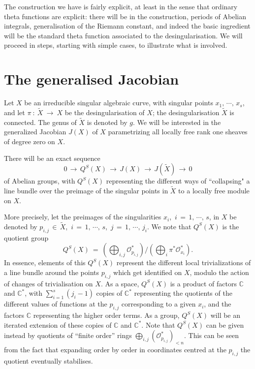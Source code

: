 \documentclass[12pt,reqno]{amsart}
\numberwithin{equation}{section}
\theoremstyle{definition}
\theoremstyle{remark}
\def\bC{{\mathbb {C}}}
\def\pO{{\mathcal O}}
\begin{document}
The construction we have is fairly explicit, at least in the sense that ordinary theta functions are 
explicit: there will be in the construction, periods of Abelian integrals, generalisation of the Riemann 
constant, and indeed the basic ingredient will be the standard theta function associated to the 
desingularisation. We will proceed in steps, starting with simple cases, to illustrate what is involved.

\section{The generalised Jacobian}

Let $X$ be an irreducible singular algebraic curve, with singular points $x_1,\,\cdots,\,x_s$, and let
$\pi\ :\ \widetilde X\ \longrightarrow\ X$ be the desingularisation of $X$; the
desingularisation $\widetilde X$ is connected. The genus of $\widetilde X$ is denoted by $g$. We will be
interested in the 
generalized Jacobian $J(X)$ of $X$ parametrizing all locally free rank one sheaves of degree zero on $X$.

There will be an exact sequence 
\begin{equation}\label{e1}
0\,\longrightarrow\, Q^S(X) \,\longrightarrow\, J(X)\, \longrightarrow\, J(\widetilde X)
\,\longrightarrow\, 0
\end{equation}
of Abelian groups, with $Q^S(X)$ representing the different ways of ``collapsing" a line bundle over
the preimage of the singular points in $\widetilde X$ to a locally free module on $X$.

More precisely, let the  preimages  of the singularities $x_i$,\, $i\,=\,1,\,\cdots,\,s$, in $X$ be
denoted by $p_{i,j}\,\in\, \widetilde X$,\, $i\,=\, 1,\,\cdots ,\,s$,\, $j \,=\, 1,\,\cdots ,\,j_i$.
We note that $Q^S(X)$ is the quotient group
\begin{equation}\label{e2}
Q^S(X)\ =\ \left(\bigoplus_{i,j} \pO^*_{p_{i,j}}\right){\Big/}\left(\bigoplus_i \pi^*\pO^*_{x_i}\right).
\end{equation} 
In essence, elements of this $Q^S(X)$ represent the different local trivializations of a line
bundle around the points $p_{i,j}$ which get identified on $X$, modulo the action of changes of
trivialisation on $X$. As a space, $Q^S(X)$ is a product of factors $\bC$ and $\bC^*$, with
$\sum_{i=1}^s (j_i-1)$ copies of $\bC^*$ representing the quotients of the different values of
functions at the $p_{i,j}$ corresponding to a given $x_i$, and the factors $\bC$ representing
the higher order terms. As a group, $Q^S(X)$ will be an iterated extension of these
copies of $\bC$ and $\bC^*$. Note that $Q^S(X)$ can be given instead by quotients of ``finite order''
rings $\bigoplus_{i,j}( \pO^*_{p_{i,j}})_{<n}$. This can be
seen from the fact that expanding order by order in coordinates centred at the $p_{i,j}$ the quotient
eventually stabilises. 
\end{document}
